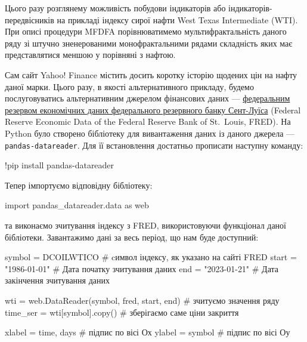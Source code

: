 \documentclass[
  letterpaper,
]{report}
\newenvironment{Shaded}{\begin{snugshade}}{\end{snugshade}}
\newcommand{\CommentTok}[1]{\textcolor[rgb]{0.37,0.37,0.37}{#1}}
\newcommand{\ImportTok}[1]{\textcolor[rgb]{0.00,0.46,0.62}{#1}}
\newcommand{\NormalTok}[1]{\textcolor[rgb]{0.00,0.23,0.31}{#1}}
\newcommand{\OperatorTok}[1]{\textcolor[rgb]{0.37,0.37,0.37}{#1}}
\newcommand{\StringTok}[1]{\textcolor[rgb]{0.13,0.47,0.30}{#1}}
\begin{document}
Цього разу розглянему можливість побудови індикаторів або
індикаторів-передвісників на прикладі індексу сирої нафти West Texas
Intermediate (WTI). При описі процедури MFDFA порівнюватимемо
мультифрактальність даного ряду зі штучно зненерованими монофрактальними
рядами складність яких має представлятися меншою у порівняні з нафтою.

Сам сайт Yahoo! Finance містить досить коротку історію щодених цін на
нафту даної марки. Цього разу, в якості альтернативного прикладу, будемо
послуговуватись альтернативним джерелом фінансових даних ---
\href{https://fred.stlouisfed.org}{федеральним резервом економічних
даних федерального резервного банку Сент-Луїса} (Federal Reserve
Economic Data of the Federal Reserve Bank of St.~Louis, FRED). На Python
було створено бібліотеку для вивантаження даних із даного джерела ---
\texttt{pandas-datareader}. Для її встановлення достатньо прописати
наступну команду:

\begin{Shaded}
\begin{Highlighting}[]
\OperatorTok{!}\NormalTok{pip install pandas}\OperatorTok{{-}}\NormalTok{datareader}
\end{Highlighting}
\end{Shaded}

Тепер імпортуємо відповідну бібліотеку:

\begin{Shaded}
\begin{Highlighting}[]
\ImportTok{import}\NormalTok{ pandas\_datareader.data }\ImportTok{as}\NormalTok{ web}
\end{Highlighting}
\end{Shaded}

та виконаємо зчитування індексу з FRED, використовуючи функціонал даної
бібліотеки. Завантажимо дані за весь період, що нам буде доступний:

\begin{Shaded}
\begin{Highlighting}[]
\NormalTok{symbol }\OperatorTok{=} \StringTok{\textquotesingle{}DCOILWTICO\textquotesingle{}}    \CommentTok{\# cимвол індексу, як указано на сайті FRED}
\NormalTok{start }\OperatorTok{=} \StringTok{"1986{-}01{-}01"}     \CommentTok{\# Дата початку зчитування даних}
\NormalTok{end }\OperatorTok{=} \StringTok{"2023{-}01{-}21"}       \CommentTok{\# Дата закінчення зчитування даних}

\NormalTok{wti }\OperatorTok{=}\NormalTok{ web.DataReader(symbol, }\StringTok{\textquotesingle{}fred\textquotesingle{}}\NormalTok{, start, end) }\CommentTok{\# зчитуємо значення ряду }
\NormalTok{time\_ser }\OperatorTok{=}\NormalTok{ wti[symbol].copy()                    }\CommentTok{\# зберігаємо саме ціни закриття}

\NormalTok{xlabel }\OperatorTok{=} \StringTok{\textquotesingle{}time, days\textquotesingle{}}    \CommentTok{\# підпис по вісі Ох }
\NormalTok{ylabel }\OperatorTok{=}\NormalTok{ symbol          }\CommentTok{\# підпис по вісі Оу}
\end{Highlighting}
\end{Shaded}
\end{document}
